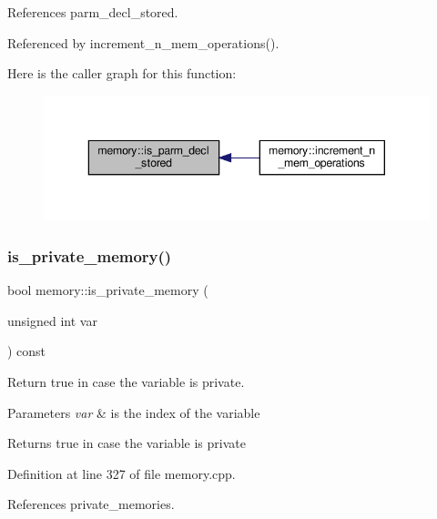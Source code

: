 References parm\+\_\+decl\+\_\+stored.



Referenced by increment\+\_\+n\+\_\+mem\+\_\+operations().

Here is the caller graph for this function\+:
\nopagebreak
\begin{figure}[H]
\begin{center}
\leavevmode
\includegraphics[width=343pt]{d8/d99/classmemory_aea74338373012206d2b769a4f1e144c4_icgraph}
\end{center}
\end{figure}
\mbox{\label{classmemory_a3f36ef4c278bf2a45a2834523c484c7f}} 
\subsubsection{\texorpdfstring{is\+\_\+private\+\_\+memory()}{is\_private\_memory()}}
{\footnotesize\ttfamily bool memory\+::is\+\_\+private\+\_\+memory (\begin{DoxyParamCaption}\item[{unsigned int}]{var }\end{DoxyParamCaption}) const}



Return true in case the variable is private. 


\begin{DoxyParams}{Parameters}
{\em var} & is the index of the variable \\
\hline
\end{DoxyParams}
\begin{DoxyReturn}{Returns}
true in case the variable is private 
\end{DoxyReturn}


Definition at line 327 of file memory.\+cpp.



References private\+\_\+memories.



